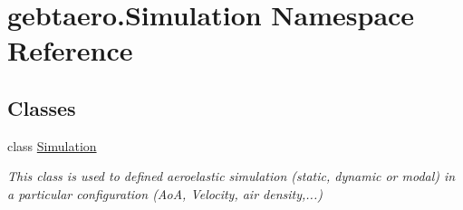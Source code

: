 \hypertarget{namespacegebtaero_1_1_simulation}{}\section{gebtaero.\+Simulation Namespace Reference}
\label{namespacegebtaero_1_1_simulation}
\subsection*{Classes}
\begin{DoxyCompactItemize}
\item 
class \hyperlink{classgebtaero_1_1_simulation_1_1_simulation}{Simulation}
\begin{DoxyCompactList}\small\item\em This class is used to defined aeroelastic simulation (static, dynamic or modal) in a particular configuration (AoA, Velocity, air density,...) \end{DoxyCompactList}\end{DoxyCompactItemize}
